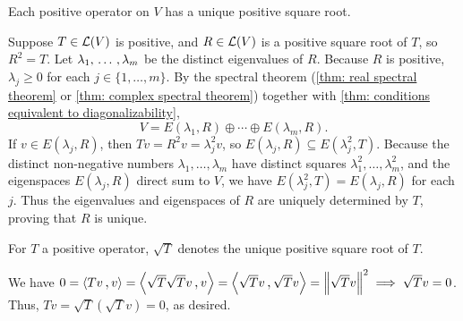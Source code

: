 \begin{thm}
  \label{thm: uniqueness of square root}
  Each positive operator on $V$ has a unique positive square root.
\end{thm}
\begin{prf}
  Suppose $T \in \mathcal{L}(V)$ is positive, and $R \in \mathcal{L}(V)$ is a positive square root of $T$, so $R^2 = T$.
  Let $\lambda_1, {\, \ldots \,\,}, \lambda_m$ be the distinct eigenvalues of $R$. Because $R$ is positive, $\lambda_j \ge 0$ for each $j \in \{1, \dots, m\}$.
  By the spectral theorem (\ref{thm: real spectral theorem} or \ref{thm: complex spectral theorem}) together with \ref{thm: conditions equivalent to diagonalizability},
  \begin{equation}
    V = E(\lambda_1, R) \oplus \cdots \oplus E(\lambda_m, R).
  \end{equation}
  If $v \in E(\lambda_j, R)$, then $Tv = R^2v = \lambda_j^2 v$, so $E(\lambda_j, R) \subseteq E(\lambda_j^2, T)$.
  Because the distinct non-negative numbers $\lambda_1, \dots, \lambda_m$ have distinct squares $\lambda_1^2, \dots, \lambda_m^2$, and the eigenspaces $E(\lambda_j, R)$ direct sum to $V$, we have $E(\lambda_j^2, T) = E(\lambda_j, R)$ for each $j$.
  Thus the eigenvalues and eigenspaces of $R$ are uniquely determined by $T$, proving that $R$ is unique.
\end{prf}

\begin{mydef}
  For $T$ a positive operator, $\sqrt{T}$ denotes the unique positive square root of $T$.
\end{mydef}

\begin{prf}
  We have $0 = \ip{Tv}{v}= \ip{\sqrt{T}\sqrt{T}v}{v} = \ip{\sqrt{T}v}{\sqrt{T}v} = \norm{\sqrt{T}v}^2 \implies \sqrt{T}v = 0$. Thus, $Tv = \sqrt{T}\left(\sqrt{T}v\right)=0$, as desired.
\end{prf}